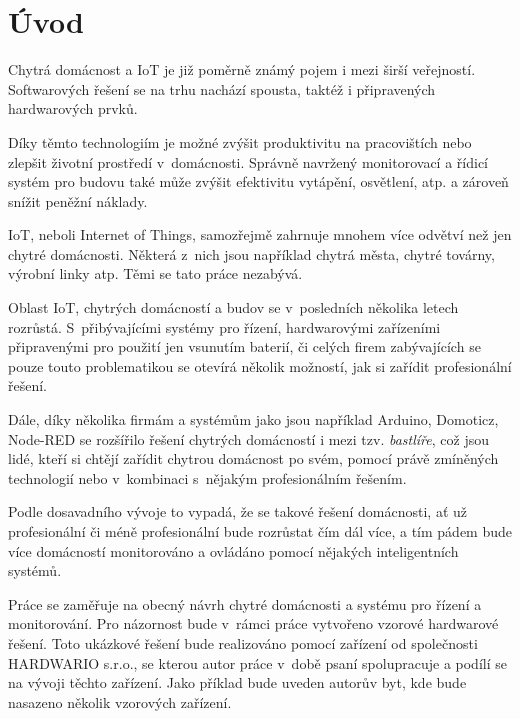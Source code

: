 \chapter{Úvod}

Chytrá domácnost a IoT je již poměrně známý pojem i mezi širší veřejností. Softwarových řešení se na trhu nachází spousta, taktéž i připravených hardwarových prvků.

Díky těmto technologiím je možné zvýšit produktivitu na pracovištích nebo zlepšit životní prostředí v~domácnosti. Správně navržený monitorovací a řídicí systém pro budovu také může zvýšit efektivitu vytápění, osvětlení, atp. a zároveň snížit peněžní náklady.

IoT, neboli Internet of Things, samozřejmě zahrnuje mnohem více odvětví než jen chytré domácnosti. Některá z~nich jsou například chytrá města, chytré továrny, výrobní linky atp. Těmi se tato práce nezabývá.

Oblast IoT, chytrých domácností a budov se v~posledních několika letech rozrůstá. S~přibývajícími systémy pro řízení, hardwarovými zařízeními připravenými pro použití jen vsunutím baterií, či celých firem zabývajících se pouze touto problematikou se otevírá několik možností, jak si zařídit profesionální řešení.

Dále, díky několika firmám a systémům jako jsou například Arduino, Domoticz, Node-RED se rozšířilo řešení chytrých domácností i mezi tzv. \emph{bastlíře}, což jsou lidé, kteří si chtějí zařídit chytrou domácnost po svém, pomocí právě zmíněných technologií nebo v~kombinaci s~nějakým profesionálním řešením.

Podle dosavadního vývoje to vypadá, že se takové řešení domácnosti, ať už profesionální či méně profesionální bude rozrůstat čím dál více, a tím pádem bude více domácností monitorováno a ovládáno pomocí nějakých inteligentních systémů.

Práce se zaměřuje na obecný návrh chytré domácnosti a systému pro řízení a monitorování. Pro názornost bude v~rámci práce vytvořeno vzorové hardwarové řešení. Toto ukázkové řešení bude realizováno pomocí zařízení od společnosti HARDWARIO s.r.o., se kterou autor práce v~době psaní spolupracuje a podílí se na vývoji těchto zařízení. Jako příklad bude uveden autorův byt, kde bude nasazeno několik vzorových zařízení.

